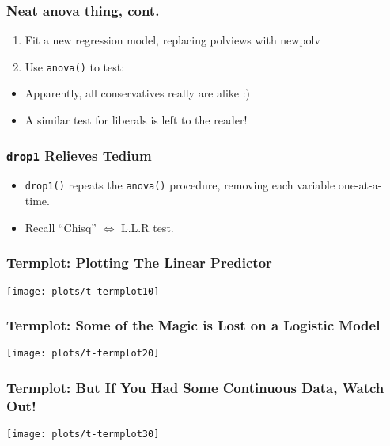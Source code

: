 \documentclass[10pt,english]{beamer}
\begin{document}
\begin{frame}[containsverbatim]
  \frametitle{Neat anova thing, cont.}

  \begin{enumerate}
  \item Fit a new regression model, replacing polviews with newpolv



 \item Use \texttt{anova()} to test:


\end{enumerate}
\begin{itemize}
\item Apparently, all conservatives really are alike :)
\item A similar test for liberals is left to the reader!
\end{itemize}
\end{frame}




\begin{frame}[containsverbatim]
  \frametitle{\texttt{drop1} Relieves Tedium}

  \begin{itemize}
  \item \texttt{drop1()} repeats the \texttt{anova()} procedure,
    removing each variable one-at-a-time.



   \item Recall ``Chisq'' $\Leftrightarrow$ L.L.R test.
   \end{itemize}
 \end{frame}




\begin{frame}[containsverbatim]
  \frametitle{Termplot: Plotting The Linear Predictor}



\texttt{[image: plots/t-termplot10]}
\end{frame}


\begin{frame}[containsverbatim]
  \frametitle{Termplot: Some of the Magic is Lost on a Logistic Model}



\texttt{[image: plots/t-termplot20]}
\end{frame}



\begin{frame}[containsverbatim]
  \frametitle{Termplot: But If You Had Some Continuous Data, Watch Out!}


\texttt{[image: plots/t-termplot30]}
\end{frame}
\end{document}
